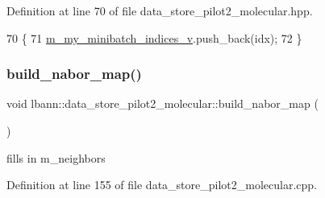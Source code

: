 Definition at line 70 of file data\+\_\+store\+\_\+pilot2\+\_\+molecular.\+hpp.


\begin{DoxyCode}
70                                     \{
71     \hyperlink{classlbann_1_1generic__data__store_a41f7fec1f1f3d6568a5765be7a6784eb}{m\_my\_minibatch\_indices\_v}.push\_back(idx);
72   \}
\end{DoxyCode}
\mbox{\label{classlbann_1_1data__store__pilot2__molecular_af70726cfb8377832ce457d9b874bf34e}} 
\subsubsection{\texorpdfstring{build\+\_\+nabor\+\_\+map()}{build\_nabor\_map()}}
{\footnotesize\ttfamily void lbann\+::data\+\_\+store\+\_\+pilot2\+\_\+molecular\+::build\+\_\+nabor\+\_\+map (\begin{DoxyParamCaption}{ }\end{DoxyParamCaption})\hspace{0.3cm}{\ttfamily [protected]}}



fills in m\+\_\+neighbors 



Definition at line 155 of file data\+\_\+store\+\_\+pilot2\+\_\+molecular.\+cpp.


